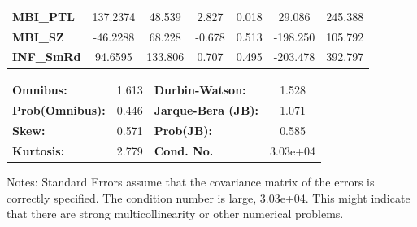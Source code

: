 \begin{center}
\begin{tabular}{lcccccc}
\textbf{MBI\_PTL}  &     137.2374  &       48.539     &     2.827  &         0.018        &       29.086    &      245.388     \\
\textbf{MBI\_SZ}   &     -46.2288  &       68.228     &    -0.678  &         0.513        &     -198.250    &      105.792     \\
\textbf{INF\_SmRd} &      94.6595  &      133.806     &     0.707  &         0.495        &     -203.478    &      392.797     \\
\bottomrule
\end{tabular}
\begin{tabular}{lclc}
\textbf{Omnibus:}       &  1.613 & \textbf{  Durbin-Watson:     } &    1.528  \\
\textbf{Prob(Omnibus):} &  0.446 & \textbf{  Jarque-Bera (JB):  } &    1.071  \\
\textbf{Skew:}          &  0.571 & \textbf{  Prob(JB):          } &    0.585  \\
\textbf{Kurtosis:}      &  2.779 & \textbf{  Cond. No.          } & 3.03e+04  \\
\bottomrule
\end{tabular}
\end{center}

Notes: \newline
 [1] Standard Errors assume that the covariance matrix of the errors is correctly specified. \newline
 [2] The condition number is large, 3.03e+04. This might indicate that there are \newline
 strong multicollinearity or other numerical problems.